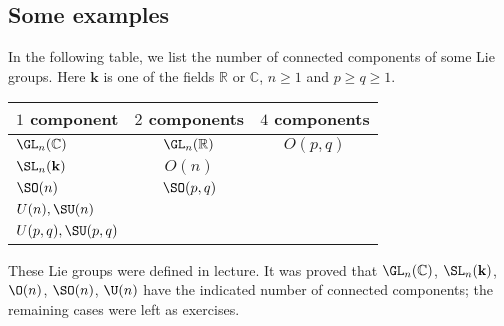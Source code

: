 \documentclass[reqno]{amsart} 
\begin{document}
\subsection{Some examples\label{sec:connectedness-examples}}
\label{sec:orgdc3e70e}
In the following table,
we list the number of connected components
of some Lie groups.
Here $\mathbf{k}$ is one of the fields
$\mathbb{R}$ or $\mathbb{C}$,
$n \geq 1$ and $p \geq q \geq 1$.
\begin{center}
\begin{tabular}
{||l|c|c||}
    \hline
  $1$ component & $2$ components & $4$ components                               \\ \hline
  $\GL_n(\mathbb{C})$
      & $\GL_n(\mathbb{R})$
      & $O(p,q)$ \\ [1ex]
  $\SL_n(\mathbf{k})$
      & $O(n)$ 
      &   \\ [1ex]
$\SO(n)$
      & $\SO(p,q)$
      &         \\ [1ex]
  $U(n), \SU(n)$
      & 
      &  \\
  $U(p,q), \SU(p,q)$
      &  
      &                                                       \\ \hline
\end{tabular}
\end{center}
These Lie groups were defined in lecture.
It was proved that $\GL_n(\mathbb{C})$, $\SL_n(\mathbf{k})$, $\O(n)$, $\SO(n)$, $\U(n)$
have the indicated number of connected components;
the remaining cases were left as exercises.
\end{document}
